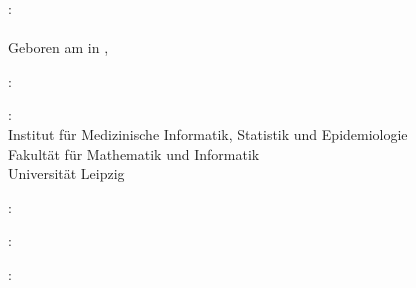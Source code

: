 \thispagestyle{empty}

\hfill

\vfill

\noindent{}: \\
\myName{}\\%
Geboren am {\mybirthday} in {\mybirthtown}, {\mybirthcountry}
\medskip

\noindent{}: \\
\emph{\myTitle}

\medskip

\noindent{}: \\
Institut für Medizinische Informatik, Statistik und Epidemiologie \\
Fakultät für Mathematik und Informatik \\
Universität Leipzig

\medskip

\noindent{}: \\
\myProf

\medskip

\noindent{}: \\
\myOtherProf

\medskip

\noindent{}: \\
\mySupervisor

